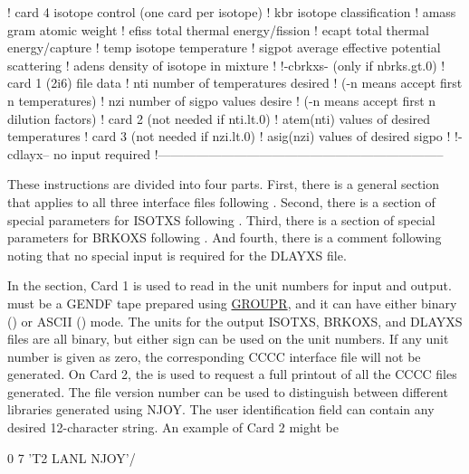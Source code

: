\begin{ccode}
   ! card 4 isotope control (one card per isotope)
   !    kbr       isotope classification
   !    amass     gram atomic weight
   !    efiss     total thermal energy/fission
   !    ecapt     total thermal energy/capture
   !    temp      isotope temperature
   !    sigpot     average effective potential scattering
   !    adens     density of isotope in mixture
   !
   !-cbrkxs- (only if nbrks.gt.0)
   ! card 1 (2i6) file data
   !    nti       number of temperatures desired
   !              (-n means accept first n temperatures)
   !    nzi       number of sigpo values desire
   !              (-n means accept first n dilution factors)
   ! card 2 (not needed if nti.lt.0)
   !    atem(nti) values of desired temperatures
   ! card 3 (not needed if nzi.lt.0)
   !    asig(nzi) values of desired sigpo
   !
   !-cdlayx-- no input required
   !--------------------------------------------------------------------
\end{ccode}
\normalsize

These instructions are divided into four parts.  First, there is a
general section that applies to all three interface files following
.  Second, there is a section of special parameters
for ISOTXS following . Third, there is a section of
special parameters for BRKOXS following .  And fourth,
there is a comment following  noting that no special
input is required for the DLAYXS file.

In the  section, Card 1 is used to read in the unit
numbers for input and output.   must be a GENDF tape
prepared using \hyperlink{sGROUPRhy}{GROUPR}, and it
can have either binary ()
or ASCII () mode.  The units for the output ISOTXS,
BRKOXS, and DLAYXS files are all binary, but either sign can be
used on the unit numbers.  If any unit number is given as zero,
the corresponding CCCC interface file will not be generated.
On Card 2, the  is used to request a full
printout of all the CCCC files generated.  The file version number
 can be used to distinguish between different libraries
generated using NJOY.  The user identification field 
can contain any desired 12-character string.  An example of Card 2
might be

\small
\begin{ccode}

  0  7  'T2 LANL NJOY'/

\end{ccode}
\normalsize

